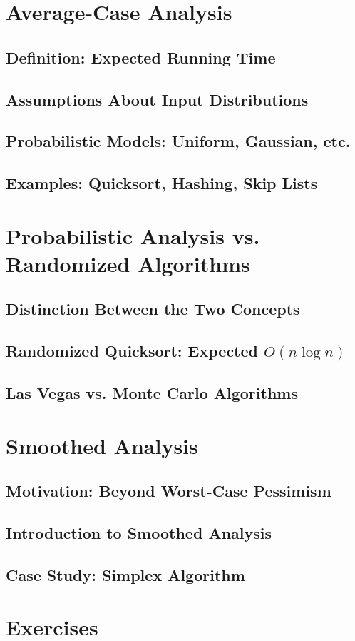 \section{Average-Case Analysis}
\subsection{Definition: Expected Running Time}
\subsection{Assumptions About Input Distributions}
\subsection{Probabilistic Models: Uniform, Gaussian, etc.}
\subsection{Examples: Quicksort, Hashing, Skip Lists}

\section{Probabilistic Analysis vs. Randomized Algorithms}
\subsection{Distinction Between the Two Concepts}
\subsection{Randomized Quicksort: Expected $O(n \log n)$}
\subsection{Las Vegas vs. Monte Carlo Algorithms}

\section{Smoothed Analysis}
\subsection{Motivation: Beyond Worst-Case Pessimism}
\subsection{Introduction to Smoothed Analysis}
\subsection{Case Study: Simplex Algorithm}

\section{Exercises}